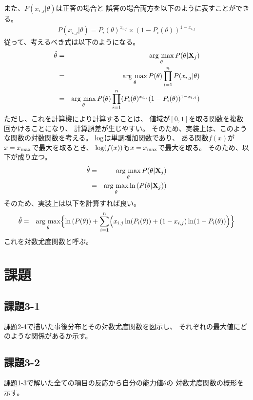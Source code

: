 \documentclass[12pt]{jarticle}
\begin{document}
また、$P(x_{i,j}|\theta)$は正答の場合と
誤答の場合両方を以下のように表すことができる。
\begin{eqnarray}
    P(x_{i,j}|\theta)=P_i(\theta)^{x_{i,j}}\times (1-P_i(\theta))^{1-x_{i,j}}
\end{eqnarray}
従って、考えるべき式は以下のようになる。
\begin{eqnarray}
    \hat{\theta}&=& \mathop{\rm arg~max}\limits_{\theta} P(\theta|{\bf X}_j) \nonumber\\
    &=& \mathop{\rm arg~max}\limits_{\theta} P(\theta)\prod_{i=1}^n P(x_{i,j}|\theta) \nonumber\\
    &=& \mathop{\rm arg~max}\limits_{\theta} P(\theta)\prod_{i=1}^n (P_i(\theta)^{x_{i,j}}(1-P_i(\theta))^{1-x_{i,j}})
\end{eqnarray}
ただし、これを計算機により計算することは、
値域が$[0,1]$を取る関数を複数回かけることになり、
計算誤差が生じやすい。
そのため、実装上は、このような関数の対数関数を考える。
${\rm log}$は単調増加関数であり、
ある関数$f(x)$が$x=x_{\rm max}$で最大を取るとき、
${\rm log}(f(x))$も$x=x_{\rm max}$で最大を取る。
そのため、以下が成り立つ。
\begin{eqnarray}
    \hat{\theta}&=& \mathop{\rm arg~max}\limits_{\theta} P(\theta|{\bf X}_j)\\
    &=& \mathop{\rm arg~max}\limits_{\theta} \ln{(P(\theta|{\bf X}_j))}
\end{eqnarray}
そのため、実装上は以下を計算すれば良い。
\begin{eqnarray}
    \hat{\theta}&=& \mathop{\rm arg~max}\limits_{\theta} \Bigl\{\ln{(P(\theta))
    +\sum_{i=1}^n \Bigl(x_{i,j}\ln(P_i(\theta))+(1-x_{i,j})\ln(1-P_i(\theta))\Bigr)}\Bigr\}
\end{eqnarray}
これを対数尤度関数と呼ぶ。

\section{課題}
\subsection{課題3-1}
\begin{shadebox}
    課題2-4で描いた事後分布とその対数尤度関数を図示し、
    それぞれの最大値にどのような関係があるか示す。
\end{shadebox}

\subsection{課題3-2}
\begin{shadebox}
    課題1-3で解いた全ての項目の反応から自分の能力値$\theta$の
    対数尤度関数の概形を示す。
\end{shadebox}
\end{document}
